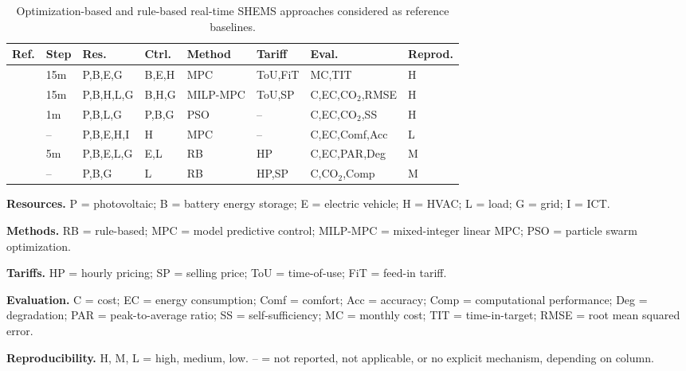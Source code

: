 \documentclass[preprint,12pt, 3p]{elsarticle}
\begin{document}
\begin{table}[t]
\centering
\footnotesize
\caption{Optimization-based and rule-based real-time SHEMS approaches considered as reference baselines.}
\label{tab:opt_baselines}
\begin{tabular}{@{}llllllll@{}}
\toprule
\textbf{Ref.} & \textbf{Step} & \textbf{Res.} & \textbf{Ctrl.} & \textbf{Method} & \textbf{Tariff} & \textbf{Eval.} & \textbf{Reprod.} \\
\midrule

\cite{seal2023centralized-90d}
& 15m & P,B,E,G & B,E,H & MPC & ToU,FiT & MC,TIT & H \\

\cite{gomes2023milp-based-c2e}
& 15m & P,B,H,L,G & B,H,G & MILP-MPC & ToU,SP & C,EC,CO$_2$,RMSE & H \\

\cite{tifoura2025home-d26}
& 1m & P,B,L,G & P,B,G & PSO & -- & C,EC,CO$_2$,SS & H \\

\cite{teng2025integrating-1fd}
& -- & P,B,E,H,I & H & MPC & -- & C,EC,Comf,Acc & L \\

\cite{abdelaal2021integration-d54}
& 5m & P,B,E,L,G & E,L & RB & HP & C,EC,PAR,Deg & M \\

\cite{rehman2026iot-4dc}
& -- & P,B,G & L & RB & HP,SP & C,CO$_2$,Comp & M \\

\bottomrule
\end{tabular}

\vspace{2pt}
\begin{minipage}{0.98\textwidth}
\footnotesize
\textbf{Resources.} P = photovoltaic; B = battery energy storage; E = electric vehicle; H = HVAC; L = load; G = grid; I = ICT.

\textbf{Methods.} RB = rule-based; MPC = model predictive control; MILP-MPC = mixed-integer linear MPC; PSO = particle swarm optimization.

\textbf{Tariffs.} HP = hourly pricing; SP = selling price; ToU = time-of-use; FiT = feed-in tariff.

\textbf{Evaluation.} C = cost; EC = energy consumption; Comf = comfort; Acc = accuracy; Comp = computational performance; Deg = degradation; PAR = peak-to-average ratio; SS = self-sufficiency; MC = monthly cost; TIT = time-in-target; RMSE = root mean squared error.

\textbf{Reproducibility.} H, M, L = high, medium, low. -- = not reported, not applicable, or no explicit mechanism, depending on column.
\end{minipage}
\end{table}
\end{document}
